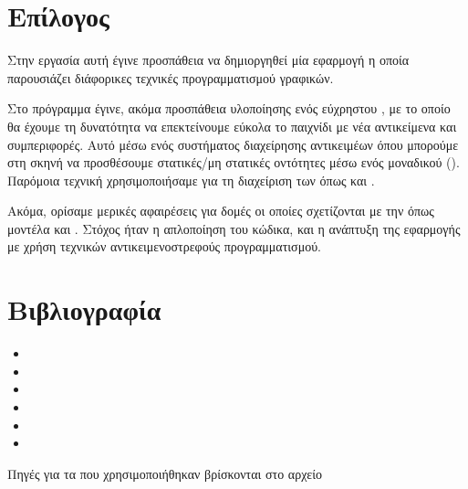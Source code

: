 \documentclass[11pt]{scrartcl} %
\begin{document}
\section{Επίλογος}

Στην εργασία αυτή έγινε προσπάθεια να δημιοργηθεί μία εφαρμογή 
η οποία παρουσιάζει διάφορικες τεχνικές προγραμματισμού γραφικών. 

Στο πρόγραμμα έγινε, ακόμα προσπάθεια υλοποίησης ενός εύχρηστου , με το
οποίο θα έχουμε τη δυνατότητα να επεκτείνουμε εύκολα το παιχνίδι με νέα
αντικείμενα και συμπεριφορές. Αυτό μέσω ενός συστήματος διαχείρησης αντικειμέων
όπου μπορούμε στη σκηνή να προσθέσουμε στατικές/μη στατικές οντότητες μέσω ενός
μοναδικού  (). Παρόμοια τεχνική
χρησιμοποιήσαμε για τη διαχείριση των  όπως  και
.

Ακόμα, ορίσαμε μερικές αφαιρέσεις για δομές οι οποίες σχετίζονται με
την  όπως μοντέλα και . 
Στόχος ήταν η απλοποίηση του κώδικα, και η ανάπτυξη της εφαρμογής 
με χρήση τεχνικών αντικειμενοστρεφούς προγραμματισμού.

\section{Βιβλιογραφία}
\small
\begin{itemize}
    \item {}
    \item {}
    \item {}
    \item {}
    \item {}
    \item {}
\end{itemize}
    Πηγές για τα  που χρησιμοποιήθηκαν βρίσκονται στο αρχείο 
\end{document}
